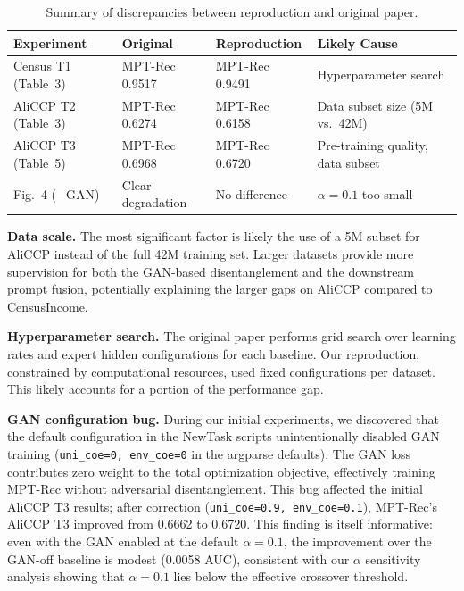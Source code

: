 \documentclass[review,anonymous]{acmart}
\begin{document}
\begin{table}[t]
  \centering
  \caption{Summary of discrepancies between reproduction and original paper.}
  \label{tab:discrepancy}
  \begin{tabular}{lp{3.5cm}p{3.5cm}p{2.5cm}}
    \toprule
    \textbf{Experiment} & \textbf{Original} & \textbf{Reproduction} & \textbf{Likely Cause} \\
    \midrule
    Census T1 (Table~3) & MPT-Rec 0.9517 & MPT-Rec 0.9491 & Hyperparameter search \\
    AliCCP T2 (Table~3) & MPT-Rec 0.6274 & MPT-Rec 0.6158 & Data subset size (5M vs.\ 42M) \\
    AliCCP T3 (Table~5) & MPT-Rec 0.6968 & MPT-Rec 0.6720 & Pre-training quality, data subset \\
    Fig.~4 ($-$GAN)    & Clear degradation & No difference & $\alpha=0.1$ too small \\
    \bottomrule
  \end{tabular}
\end{table}

\textbf{Data scale.} The most significant factor is likely the use of a 5M subset
for AliCCP instead of the full 42M training set. Larger datasets provide more
supervision for both the GAN-based disentanglement and the downstream prompt
fusion, potentially explaining the larger gaps on AliCCP compared to
CensusIncome.

\textbf{Hyperparameter search.} The original paper performs grid search over
learning rates and expert hidden configurations for each baseline. Our
reproduction, constrained by computational resources, used fixed configurations
per dataset. This likely accounts for a portion of the performance gap.

\textbf{GAN configuration bug.} During our initial experiments, we discovered that
the default configuration in the NewTask scripts unintentionally disabled GAN
training (\texttt{uni\_coe=0, env\_coe=0} in the argparse defaults). The GAN loss
contributes zero weight to the total optimization objective, effectively
training MPT-Rec without adversarial disentanglement. This bug affected the
initial AliCCP T3 results; after correction (\texttt{uni\_coe=0.9,
env\_coe=0.1}), MPT-Rec's AliCCP T3 improved from 0.6662 to 0.6720.
This finding is itself informative: even with the GAN enabled at the default
$\alpha=0.1$, the improvement over the GAN-off baseline is modest (0.0058 AUC),
consistent with our $\alpha$ sensitivity analysis showing that $\alpha=0.1$ lies
below the effective crossover threshold.
\end{document}
